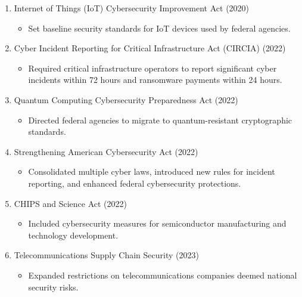 \begin{enumerate}
\begin{description}
\begin{enumerate}[label=\arabic*.]
\begin{itemize}
			\end{itemize}
			\item Internet of Things (IoT) Cybersecurity Improvement Act (2020)
			\begin{itemize}
				\item Set baseline security standards for IoT devices used by federal agencies.
			\end{itemize}
			\item Cyber Incident Reporting for Critical Infrastructure Act (CIRCIA) (2022)
			\begin{itemize}
				\item Required critical infrastructure operators to report significant cyber incidents within 72 hours and ransomware payments within 24 hours.
			\end{itemize}
			\item Quantum Computing Cybersecurity Preparedness Act (2022)
			\begin{itemize}
				\item Directed federal agencies to migrate to quantum-resistant cryptographic standards.
			\end{itemize}
			\item Strengthening American Cybersecurity Act (2022)
			\begin{itemize}
				\item Consolidated multiple cyber laws, introduced new rules for incident reporting, and enhanced federal cybersecurity protections.
			\end{itemize}
			\item CHIPS and Science Act (2022)
			\begin{itemize}
				\item Included cybersecurity measures for semiconductor manufacturing and technology development.
			\end{itemize}
			\item Telecommunications Supply Chain Security (2023)
			\begin{itemize}
				\item Expanded restrictions on telecommunications companies deemed national security risks.
			\end{itemize}
        \end{enumerate} \\
    \end{description}


\end{enumerate}
